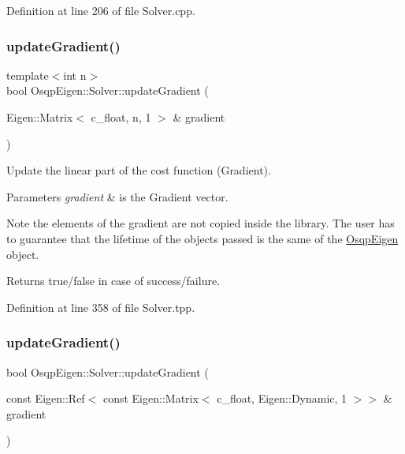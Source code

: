 Definition at line 206 of file Solver.\+cpp.

\mbox{\label{classOsqpEigen_1_1Solver_a7d1d9fdd8db3201a0ca2dcafbc289eea}} 
\subsubsection{\texorpdfstring{update\+Gradient()}{updateGradient()}\hspace{0.1cm}{\footnotesize\ttfamily [1/2]}}
{\footnotesize\ttfamily template$<$int n$>$ \\
bool Osqp\+Eigen\+::\+Solver\+::update\+Gradient (\begin{DoxyParamCaption}\item[{Eigen\+::\+Matrix$<$ c\+\_\+float, n, 1 $>$ \&}]{gradient }\end{DoxyParamCaption})}



Update the linear part of the cost function (Gradient). 


\begin{DoxyParams}{Parameters}
{\em gradient} & is the Gradient vector. \\
\hline
\end{DoxyParams}
\begin{DoxyNote}{Note}
the elements of the gradient are not copied inside the library. The user has to guarantee that the lifetime of the objects passed is the same of the \mbox{\hyperlink{namespaceOsqpEigen}{Osqp\+Eigen}} object. 
\end{DoxyNote}
\begin{DoxyReturn}{Returns}
true/false in case of success/failure. 
\end{DoxyReturn}


Definition at line 358 of file Solver.\+tpp.

\mbox{\label{classOsqpEigen_1_1Solver_a41efbcc32ccdcf2219b9fe9330faf8ea}} 
\subsubsection{\texorpdfstring{update\+Gradient()}{updateGradient()}\hspace{0.1cm}{\footnotesize\ttfamily [2/2]}}
{\footnotesize\ttfamily bool Osqp\+Eigen\+::\+Solver\+::update\+Gradient (\begin{DoxyParamCaption}\item[{const Eigen\+::\+Ref$<$ const Eigen\+::\+Matrix$<$ c\+\_\+float, Eigen\+::\+Dynamic, 1 $>$$>$ \&}]{gradient }\end{DoxyParamCaption})}



